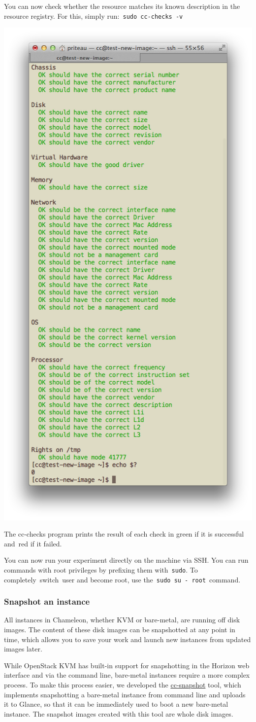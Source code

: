 You can now check whether the resource matches its known description in
the resource registry. For this, simply
run:~\texttt{sudo\ cc-checks\ -v}

{\centering \includegraphics[width=0.5\columnwidth]{images/chameleon/cc-checks.png}}

The cc-checks program prints the result of each check in green if it is
successful and~red if it failed.

You can now run your experiment directly on the machine via SSH. You can
run commands with root privileges by prefixing them with~\texttt{sudo}.
To completely~switch~user and become root, use
the~\texttt{sudo\ su\ -\ root}~command.

\subsubsection{Snapshot an instance}

All instances in Chameleon, whether KVM or bare-metal, are running off
disk images. The content of these disk images can be snapshotted at any
point in time, which allows you to save your work and launch new
instances from updated images later.

While OpenStack KVM has built-in support for snapshotting in the Horizon
web interface and via the command line, bare-metal instances require a
more complex process. To make this process easier,{ we developed the
\href{https://github.com/ChameleonCloud/ChameleonSnapshotting}{cc-snapshot}
tool, which implements snapshotting a bare-metal instance from command
line and uploads it to Glance, so that it can be immediately used to
boot a new bare-metal instance. The snapshot images created with this
tool are whole disk images.}

